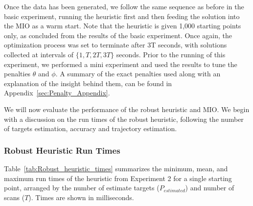 \documentclass[journal]{IEEEtran}
\begin{document}
Once the data has been generated, we follow the same sequence as before in the basic experiment, running the heuristic first and then feeding the solution into the MIO as a warm start. Note that the heuristic is given 1,000 starting points only, as concluded from the results of the basic experiment. Once again, the optimization process was set to terminate after 3T seconds, with solutions collected at intervals of $\{1,T,2T,3T\}$ seconds. Prior to the running of this experiment, we performed a mini experiment and used the results to tune the penalties $\theta$ and $\phi$. A summary of the exact penalties used along with an explanation of the insight behind them, can be found in Appendix~\ref{sec:Penalty_Appendix}. 

We will now evaluate the performance of the robust heuristic and MIO. We begin with a discussion on the run times of the robust heuristic, following the number of targets estimation, accuracy and trajectory estimation.

\subsubsection{Robust Heuristic Run Times} Table~\ref{tab:Robust_heuristic_times} summarizes the minimum, mean, and maximum run times of the heuristic from Experiment 2 for a single starting point, arranged by the number of estimate targets ($P_{estimated}$) and number of scans ($T$). Times are shown in milliseconds. 
\end{document}
